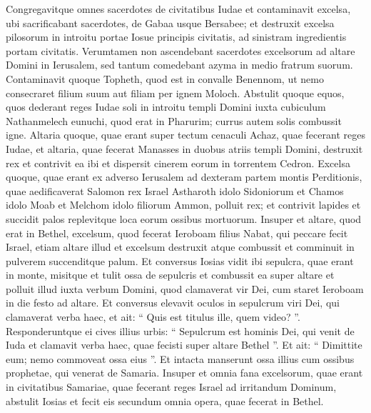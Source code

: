\begin{biblechapter}
\begin{biblechapter}
\begin{biblechapter}
\begin{biblechapter}
\begin{biblechapter}
\begin{biblechapter}
\begin{biblechapter}
\begin{biblechapter}
\begin{biblechapter}
\begin{biblechapter}
\begin{biblechapter}
\begin{biblechapter}
\begin{biblechapter}
\begin{biblechapter}
\begin{biblechapter}
\begin{biblechapter}
\begin{biblechapter}
\begin{biblechapter}
\begin{biblechapter}
\begin{biblechapter}
\begin{biblechapter}
\begin{biblechapter}
\begin{biblechapter}
 \verse Congregavitque omnes sacerdotes de civitatibus Iudae et contaminavit excelsa, ubi sacrificabant sacerdotes, de Gabaa usque Bersabee; et destruxit excelsa pilosorum in introitu portae Iosue principis civitatis, ad sinistram ingredientis portam civitatis. 
\verse Verumtamen non ascendebant sacerdotes excelsorum ad altare Domini in Ierusalem, sed tantum comedebant azyma in medio fratrum suorum. 
\verse Contaminavit quoque Topheth, quod est in convalle Benennom, ut nemo consecraret filium suum aut filiam per ignem Moloch.
 \verse Abstulit quoque equos, quos dederant reges Iudae soli in introitu templi Domini iuxta cubiculum Nathanmelech eunuchi, quod erat in Pharurim; currus autem solis combussit igne. 
\verse Altaria quoque, quae erant super tectum cenaculi Achaz, quae fecerant reges Iudae, et altaria, quae fecerat Manasses in duobus atriis templi Domini, destruxit rex et contrivit ea ibi et dispersit cinerem eorum in torrentem Cedron. 
\verse Excelsa quoque, quae erant ex adverso Ierusalem ad dexteram partem montis Perditionis, quae aedificaverat Salomon rex Israel Astharoth idolo Sidoniorum et Chamos idolo Moab et Melchom idolo filiorum Ammon, polluit rex; 
\verse et contrivit lapides et succidit palos replevitque loca eorum ossibus mortuorum.
 \verse Insuper et altare, quod erat in Bethel, excelsum, quod fecerat Ieroboam filius Nabat, qui peccare fecit Israel, etiam altare illud et excelsum destruxit atque combussit et comminuit in pulverem succenditque palum. 
\verse Et conversus Iosias vidit ibi sepulcra, quae erant in monte, misitque et tulit ossa de sepulcris et combussit ea super altare et polluit illud iuxta verbum Domini, quod clamaverat vir Dei, cum staret Ieroboam in die festo ad altare. Et conversus elevavit oculos in sepulcrum viri Dei, qui clamaverat verba haec, 
 \verse et ait: “ Quis est titulus ille, quem video? ”. Responderuntque ei cives illius urbis: “ Sepulcrum est hominis Dei, qui venit de Iuda et clamavit verba haec, quae fecisti super altare Bethel ”. 
\verse Et ait: “ Dimittite eum; nemo commoveat ossa eius ”. Et intacta manserunt ossa illius cum ossibus prophetae, qui venerat de Samaria. 
\verse Insuper et omnia fana excelsorum, quae erant in civitatibus Samariae, quae fecerant reges Israel ad irritandum Dominum, abstulit Iosias et fecit eis secundum omnia opera, quae fecerat in Bethel. 

\end{biblechapter}
\end{biblechapter}
\end{biblechapter}
\end{biblechapter}
\end{biblechapter}
\end{biblechapter}
\end{biblechapter}
\end{biblechapter}
\end{biblechapter}
\end{biblechapter}
\end{biblechapter}
\end{biblechapter}
\end{biblechapter}
\end{biblechapter}
\end{biblechapter}
\end{biblechapter}
\end{biblechapter}
\end{biblechapter}
\end{biblechapter}
\end{biblechapter}
\end{biblechapter}
\end{biblechapter}
\end{biblechapter}
